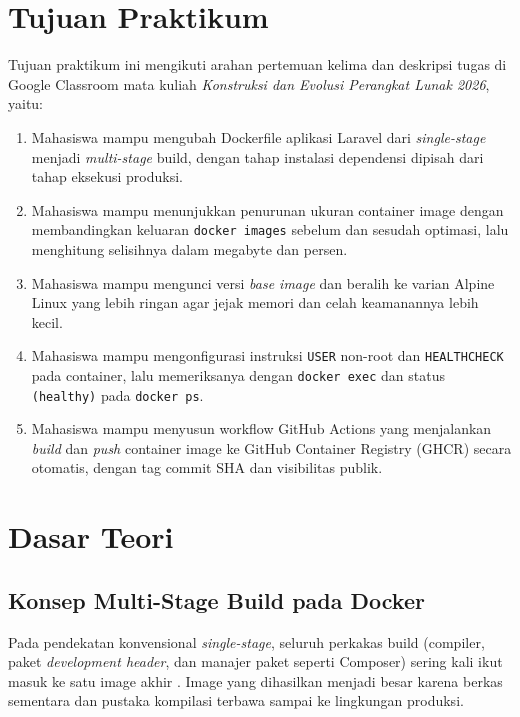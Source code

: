 \documentclass[a4paper,oneside,12pt]{report}
\begin{document}
\setcounter{page}{3}

\chapter[Tujuan Praktikum]{Tujuan Praktikum}
Tujuan praktikum ini mengikuti arahan pertemuan kelima dan deskripsi tugas di Google Classroom mata kuliah \textit{Konstruksi dan Evolusi Perangkat Lunak 2026}, yaitu:
\begin{enumerate}
    \item Mahasiswa mampu mengubah Dockerfile aplikasi Laravel dari \textit{single-stage} menjadi \textit{multi-stage} build, dengan tahap instalasi dependensi dipisah dari tahap eksekusi produksi.
    \item Mahasiswa mampu menunjukkan penurunan ukuran container image dengan membandingkan keluaran \texttt{docker images} sebelum dan sesudah optimasi, lalu menghitung selisihnya dalam megabyte dan persen.
    \item Mahasiswa mampu mengunci versi \textit{base image} dan beralih ke varian Alpine Linux yang lebih ringan agar jejak memori dan celah keamanannya lebih kecil.
    \item Mahasiswa mampu mengonfigurasi instruksi \texttt{USER} non-root dan \texttt{HEALTHCHECK} pada container, lalu memeriksanya dengan \texttt{docker exec} dan status \texttt{(healthy)} pada \texttt{docker ps}.
    \item Mahasiswa mampu menyusun workflow GitHub Actions yang menjalankan \textit{build} dan \textit{push} container image ke GitHub Container Registry (GHCR) secara otomatis, dengan tag commit SHA dan visibilitas publik.
\end{enumerate}

\clearpage

\chapter{Dasar Teori}

\section{Konsep Multi-Stage Build pada Docker}
Pada pendekatan konvensional \textit{single-stage}, seluruh perkakas build (compiler, paket \textit{development header}, dan manajer paket seperti Composer) sering kali ikut masuk ke satu image akhir \cite{docker-docs}. Image yang dihasilkan menjadi besar karena berkas sementara dan pustaka kompilasi terbawa sampai ke lingkungan produksi.
\end{document}

